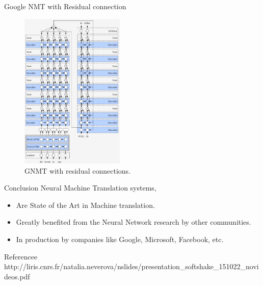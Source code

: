 ﻿\documentclass[aspectratio=43,mathserif,xcolor={usenames,dvipsnames,svgnames,table},10pt]{beamer}
\begin{document}
\begin{frame}{Google NMT with Residual connection}
 \begin{figure}[h]
    \includegraphics[height=7.5cm]{images/residual_gnmt.png}  
    \caption{ GNMT with residual connections.}
  \end{figure}
\end{frame}

\begin{frame}{Conclusion}
Neural Machine Translation systems,
\begin{itemize} 
 \item Are State of the Art in Machine translation.
 \item Greatly benefited from the Neural Network research by other communities.
 \item In production by companies like Google, Microsoft, Facebook, etc.
\end{itemize}

\end{frame}


\begin{frame}{Referencee}
 http://liris.cnrs.fr/natalia.neverova/nslides/presentation_softshake_151022_novideos.pdf
\end{frame}
\end{document}
